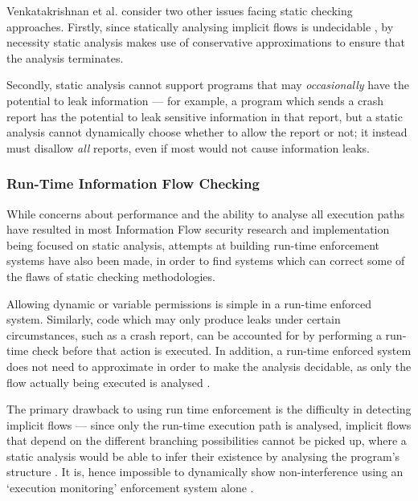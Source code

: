 Venkatakrishnan et al. \cite{venkatakrishnan2006runtime} consider two other issues facing static checking approaches. Firstly, since statically analysing implicit flows is undecidable \cite{landi1992undecidability}, by necessity static analysis makes use of conservative approximations to ensure that the analysis terminates.

Secondly, static analysis cannot support programs that may \textit{occasionally} have the potential to leak information \cite{venkatakrishnan2006runtime} --- for example, a program which sends a crash report has the potential to leak sensitive information in that report, but a static analysis cannot dynamically choose whether to allow the report or not; it instead must disallow \textit{all} reports, even if most would not cause information leaks.

\subsubsection{Run-Time Information Flow Checking}

While concerns about performance and the ability to analyse all execution paths have resulted in most Information Flow security research and implementation being focused on static analysis, attempts at building run-time enforcement systems have also been made, in order to find systems which can correct some of the flaws of static checking methodologies.

Allowing dynamic or variable permissions is simple in a run-time enforced system. Similarly, code which may only produce leaks under certain circumstances, such as a crash report, can be accounted for by performing a run-time check before that action is executed. In addition, a run-time enforced system does not need to approximate in order to make the analysis decidable, as only the flow actually being executed is analysed \cite{venkatakrishnan2006runtime}.

The primary drawback to using run time enforcement is the difficulty in detecting implicit flows \cite{sabelfeld2003if} --- since only the run-time execution path is analysed, implicit flows that depend on the different branching possibilities cannot be picked up, where a static analysis would be able to infer their existence by analysing the program's structure \cite{venkatakrishnan2006runtime}. It is, hence impossible to dynamically show non-interference using an `execution monitoring' enforcement system alone \cite{schneider2000executionmonitoring}.


